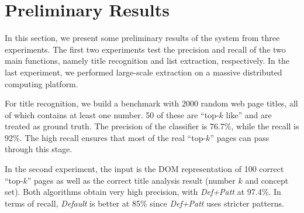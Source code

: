 \section{Preliminary Results}
\label{sec:eval}

In this section, we present some preliminary results of the system from three
experiments.  The first two experiments test the precision and recall 
of the two main functions, namely title recognition and list extraction,
respectively.
In the last experiment, we performed large-scale extraction 
on a massive distributed computing platform.

For title recognition, we build a benchmark with 2000 random web page titles,
all of which contains at least one number.
50 of these are ``top-$k$ like'' and are treated as ground truth.
The precision of the classifier is 76.7\%, 
while the recall is 92\%.
The high recall ensures that most of the real ``top-$k$'' pages can pass
through this stage.

In the second experiment, the input is the DOM representation of 
100 correct ``top-$k$'' pages
as well as the correct title analysis result (number $k$ and concept set). 
Both algorithms obtain very high precision, 
with {\em Def+Patt} at 97.4\%. 
In terms of recall, {\em Default} is better at 85\% 
since {\em Def+Patt} uses stricter patterns.

